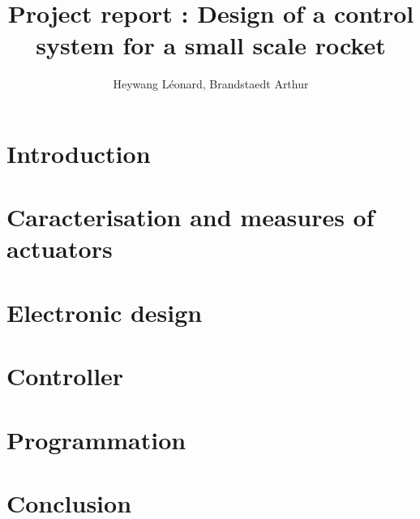 \documentclass[twoside]{report}
\author{Heywang Léonard, Brandstaedt Arthur}
\title{Project report : Design of a control system for a small scale rocket}
\date{\DTMtoday}
\begin{document}



\tableofcontents
\listoffigures

\newpage
\chapter{Introduction}


\chapter{Caracterisation and measures of actuators}


\chapter{Electronic design}


\chapter{Controller}


\chapter{Programmation}


\chapter{Conclusion}


\newpage
\appendix
\end{document}

